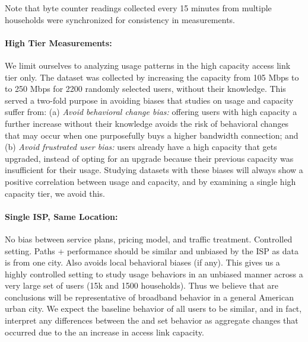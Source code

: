Note that byte counter readings collected every 15 minutes from multiple 
households were synchronized for consistency in measurements.

\paragraph{High Tier Measurements:} We limit ourselves to analyzing usage 
patterns in the high capacity access link tier only. The \test dataset was 
collected by increasing the capacity from 105 Mbps to to 250 Mbps for 2200 
randomly selected users, without their knowledge. This served a two-fold purpose 
in avoiding biases that studies on usage and capacity suffer from: (a) 
\emph{Avoid behavioral change bias:} offering users with high capacity a further 
increase without their knowledge avoids the risk of behavioral changes that may 
occur when one purposefully buys a higher bandwidth connection; and (b) 
\emph{Avoid frustrated user bias:} users already have a high capacity that gets 
upgraded, instead of opting for an upgrade because their previous capacity was 
insufficient for their usage. Studying datasets with these biases will always 
show a positive correlation between usage and capacity, and by examining a 
single high capacity tier, we avoid this.


\paragraph{Single ISP, Same Location:} No bias between service plans, pricing 
model, and traffic treatment. Controlled setting. Paths + performance should be 
similar and unbiased by the ISP as data is from one city. Also avoids local 
behavioral biases (if any).
This gives us a highly controlled setting to study usage behaviors in an 
unbiased manner across a very large set of users (15k \control and 1500 \test 
households). Thus we believe that are conclusions will be representative of 
broadband behavior in a general American urban city. We expect the baseline 
behavior of all users to be similar, and in fact, interpret any differences 
between the \control and \test set behavior as aggregate changes that occurred 
due to the an increase in access link capacity.





